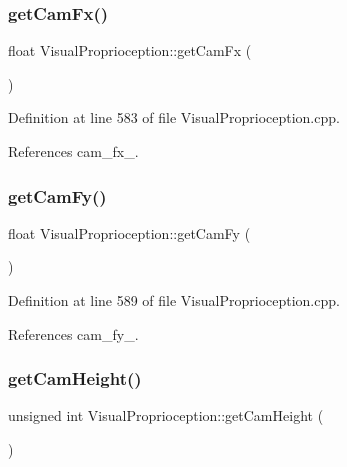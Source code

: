 \subsubsection{\texorpdfstring{get\+Cam\+Fx()}{getCamFx()}}
{\footnotesize\ttfamily float Visual\+Proprioception\+::get\+Cam\+Fx (\begin{DoxyParamCaption}{ }\end{DoxyParamCaption})}



Definition at line 583 of file Visual\+Proprioception.\+cpp.



References cam\+\_\+fx\+\_\+.

\mbox{\label{classVisualProprioception_ad10ced05538f8f5f86b4c320e857bb19}} 
\subsubsection{\texorpdfstring{get\+Cam\+Fy()}{getCamFy()}}
{\footnotesize\ttfamily float Visual\+Proprioception\+::get\+Cam\+Fy (\begin{DoxyParamCaption}{ }\end{DoxyParamCaption})}



Definition at line 589 of file Visual\+Proprioception.\+cpp.



References cam\+\_\+fy\+\_\+.

\mbox{\label{classVisualProprioception_a79a29f5b902dc1010c6e4def39e3e50d}} 
\subsubsection{\texorpdfstring{get\+Cam\+Height()}{getCamHeight()}}
{\footnotesize\ttfamily unsigned int Visual\+Proprioception\+::get\+Cam\+Height (\begin{DoxyParamCaption}{ }\end{DoxyParamCaption})}




